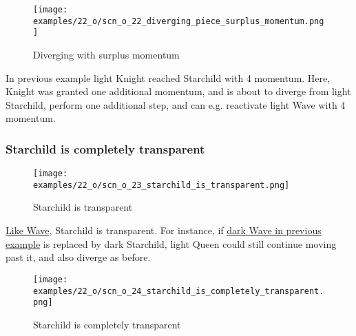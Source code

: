 \noindent
\begin{wrapfigure}[8]{l}{0.4\textwidth}
\centering
\texttt{[image: examples/22\_o/scn\_o\_22\_diverging\_piece\_surplus\_momentum.png]}
\vspace*{-0.4\baselineskip}
\caption{Diverging with surplus momentum}
\label{fig:scn_o_22_diverging_piece_surplus_momentum}
\end{wrapfigure}
In previous example light Knight reached Starchild with 4 momentum. Here, Knight
was granted one additional momentum, and is about to diverge from light Starchild,
perform one additional step, and can e.g. reactivate light Wave with 4 momentum.

\clearpage %

\subsubsection*{Starchild is completely transparent}
\label{sec:One/Starchild/Divergence/Starchild is completely transparent}

\vspace*{-1.4\baselineskip}
\noindent
\begin{figure}[!h]
\texttt{[image: examples/22\_o/scn\_o\_23\_starchild\_is\_transparent.png]}
\vspace*{-1.3\baselineskip}
\caption{Starchild is transparent}
\label{fig:scn_o_23_starchild_is_transparent}
\end{figure}

\vspace*{-0.4\baselineskip}
\hyperref[fig:scn_mv_07_wave_is_transparent]{Like Wave}, Starchild is transparent.
For instance, if
\hyperref[fig:scn_o_16_starchild_divergence_init]{dark Wave in previous example}
is replaced by dark Starchild, light Queen could still continue moving past it,
and also diverge as before.

\vspace*{-0.7\baselineskip}
\noindent
\begin{figure}[!h]
\texttt{[image: examples/22\_o/scn\_o\_24\_starchild\_is\_completely\_transparent.png]}
\vspace*{-1.3\baselineskip}
\caption{Starchild is completely transparent}
\label{fig:scn_o_24_starchild_is_completely_transparent}
\end{figure}

